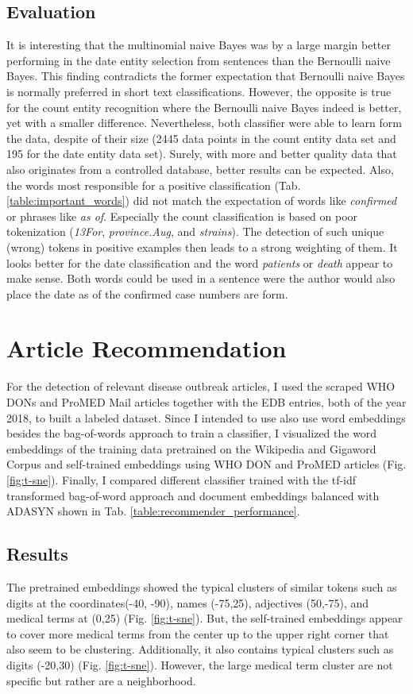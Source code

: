 \subsection{Evaluation}
  It is interesting that the multinomial naive Bayes was by a large margin better performing in the date entity selection from sentences than the Bernoulli naive Bayes.
  This finding contradicts the former expectation that Bernoulli naive Bayes is normally preferred in short text classifications.
  However, the opposite is true for the count entity recognition where the Bernoulli naive Bayes indeed is better, yet with a smaller difference.
  Nevertheless, both classifier were able to learn form the data, despite of their size (2445 data points in the count entity data set and 195 for the date entity data set). Surely, with more  and better quality data that also originates from a controlled database, better results can be expected. Also, the words most responsible for a positive classification (Tab. \ref{table:important_words}) did not match the expectation of words like \textit{confirmed} or phrases like \textit{as of}. Especially the count classification is based on poor tokenization (\textit{13For}, \textit{province.Aug}, and \textit{strains}). The detection of such unique (wrong) tokens in positive examples then leads to a strong weighting of them.  It looks better for the date classification and the word \textit{patients} or \textit{death} appear to make sense. Both words could be used in a sentence were the author would also place the date as of the confirmed case numbers are form.

\section{Article Recommendation}
  For the detection of relevant disease outbreak articles, I used the scraped WHO DONs and ProMED Mail articles together with the EDB entries, both of the year 2018, to built a labeled dataset.
  Since I intended to use also use word embeddings besides the bag-of-words approach to train a classifier, I visualized the word embeddings of the training data pretrained on the Wikipedia and Gigaword Corpus and self-trained embeddings using WHO DON and ProMED articles (Fig. \ref{fig:t-sne}).
  Finally, I compared different classifier trained with the tf-idf transformed bag-of-word approach and document embeddings balanced with ADASYN shown in Tab. \ref{table:recommender_performance}.

\subsection{Results}
  The pretrained embeddings showed the typical clusters of similar tokens such as digits at the coordinates(-40, -90), names (-75,25), adjectives (50,-75), and medical terms at (0,25) (Fig. \ref{fig:t-sne}).
  But, the self-trained embeddings appear to cover more medical terms from the center up to the upper right corner that also seem to be clustering.
  Additionally, it also contains typical clusters such as digits (-20,30) (Fig. \ref{fig:t-sne}).
  However, the large medical term cluster are not specific but rather are a neighborhood.

